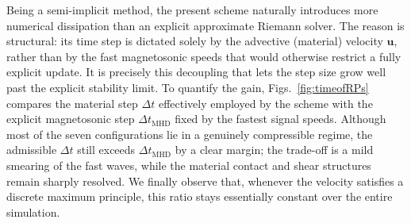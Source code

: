 \documentclass[a4paper,fleqn]{cas-sc}
\theoremstyle{definition}
\theoremstyle{remark}
\begin{document}
Being a semi-implicit method, the present scheme naturally introduces more 
numerical dissipation than an explicit approximate Riemann solver. The reason is 
structural: its time step is dictated solely by the advective (material) 
velocity $\mathbf{u}$, rather than by the fast magnetosonic speeds that would 
otherwise restrict a fully explicit update. It is precisely this decoupling that 
lets the step size grow well past the explicit stability limit. To quantify the 
gain, Figs.~\ref{fig:timeofRPs} compares the material step $\Delta t$ effectively 
employed by the scheme with the explicit magnetosonic step 
$\Delta t_{\mathrm{MHD}}$ fixed by the fastest signal speeds. Although most of the seven 
configurations lie in a genuinely compressible regime, the admissible $\Delta t$ 
still exceeds $\Delta t_{\mathrm{MHD}}$ by a clear margin; the trade-off is a 
mild smearing of the fast waves, while the material contact and shear structures 
remain sharply resolved. We finally observe that, whenever the velocity satisfies 
a discrete maximum principle, this ratio stays essentially constant over the 
entire simulation.
\end{document}
